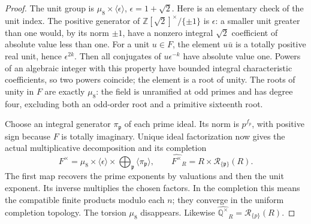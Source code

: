 \begin{proof}
The unit group is $\mu _8\times\langle\epsilon\rangle$,
$\epsilon=1+\sqrt2$.  Here is an elementary check of the
unit index.  The positive generator of
$\mathbb Z[\sqrt2]^\times/\{\pm1\}$ is $\epsilon$:
a smaller unit greater than one would, by its norm $\pm1$,
have a nonzero integral $\sqrt2$ coefficient of absolute
value less than one.  For a unit $u\in F$, the element
$u\bar u$ is a totally positive real unit, hence $\epsilon^{2k}$.
Then all conjugates of $u\epsilon^{-k}$ have absolute value one.
Powers of an algebraic integer with this property have bounded
integral characteristic coefficients, so two powers coincide;
the element is a root of unity.  The roots of unity in $F$
are exactly $\mu _8$: the field is unramified at odd primes
and has degree four, excluding both an odd-order root and
a primitive sixteenth root.

Choose an integral generator $\pi_{\mathfrak p}$ of each prime
ideal.  Its norm is $p^{f_p}$, with positive sign because
$F$ is totally imaginary.  Unique ideal factorization now gives
the actual multiplicative decomposition and its completion
\[
 F^\times=\mu _8\times\langle\epsilon\rangle
                 \times\bigoplus_{\mathfrak p}\langle\pi_{\mathfrak p}\rangle,
 \qquad
 \widehat{F^\times}_R=R\times\mathcal R_{\{\mathfrak p\}}(R).
 \tag{E103.22}
\]
The first map recovers the prime exponents by valuations and
then the unit exponent.  Its inverse multiplies the chosen
factors.  In the completion this means the compatible finite
products modulo each $n$; they converge in the uniform
completion topology.  The torsion $\mu _8$ disappears.
Likewise $\widehat{\mathbb Q^\times}_R=
\mathcal R_{\{p\}}(R)$.


\end{proof}
